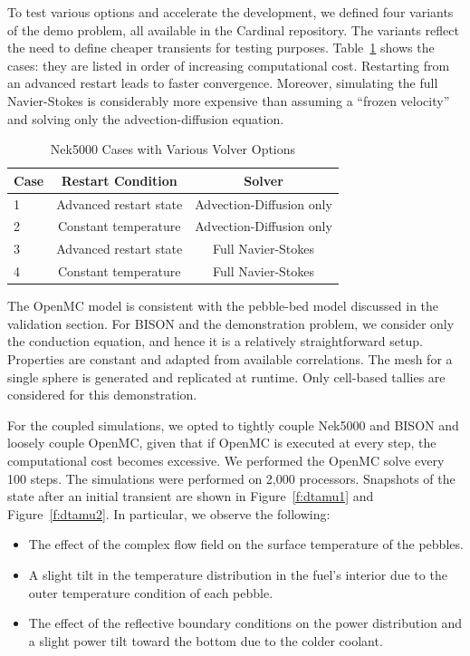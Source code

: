 To test various options and accelerate the development, we defined four variants of the demo problem, all available in the Cardinal repository. The variants reflect the need to define cheaper transients for testing purposes. Table~\ref{tab:nek} shows the cases: they are listed in order of increasing computational cost. Restarting from an advanced restart leads to faster convergence. Moreover, simulating the full Navier-Stokes is considerably more expensive than assuming a ``frozen velocity'' and solving only the advection-diffusion equation.

\begin{table}
  \centering
  \begin{tabular}{|lcc|}
    \hline \hline
    Case & Restart Condition & Solver \\
    \hline
    1 & Advanced restart state & Advection-Diffusion only \\
    2 & Constant temperature   & Advection-Diffusion only \\
    3 & Advanced restart state & Full Navier-Stokes \\
    4 & Constant temperature   & Full Navier-Stokes \\
    \hline \hline
  \end{tabular}
  \caption{Nek5000 Cases with Various Volver Options}
  \label{tab:nek}
\end{table}

The OpenMC model is consistent with the pebble-bed model discussed in the validation section. For BISON and the demonstration problem, we consider only the conduction equation, and hence it is a relatively straightforward setup. Properties are constant and adapted from available correlations. The mesh for a single sphere is generated and replicated at runtime. Only cell-based tallies are considered for this demonstration.

For the coupled simulations, we opted to tightly couple Nek5000 and BISON and loosely couple OpenMC, given that if OpenMC is executed at every step, the computational cost becomes excessive. We performed the OpenMC solve every 100 steps. The simulations were performed on 2,000 processors. Snapshots of the state after an initial transient are shown in Figure~\ref{f:dtamu1} and Figure~\ref{f:dtamu2}. In particular, we observe the following:
\begin{itemize}
  \item The effect of the complex flow field on the surface temperature of the pebbles.
  \item A slight tilt in the temperature distribution in the fuel's interior due to the outer temperature condition of each pebble.
  \item The effect of the reflective boundary conditions on the power distribution and a slight power tilt toward the bottom due to the colder coolant.
\end{itemize}

